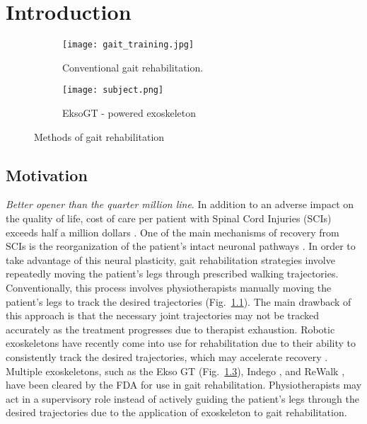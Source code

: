 \chapter{Introduction}

\begin{figure}
	\centering
	\begin{subfigure}{0.45\textwidth}
		\centering
		\texttt{[image: gait\_training.jpg]} %
		\caption{Conventional gait rehabilitation. \cite{gaitrehabgantry}}\label{fig:gantry}
	\end{subfigure}\hfill
	\begin{subfigure}{0.45\textwidth}
		\centering
		\texttt{[image: subject.png]}
		\caption{EksoGT - powered exoskeleton}\label{fig:subject}
	\end{subfigure}
	\caption{Methods of gait rehabilitation}
\end{figure}

\section{Motivation}
%

\textit{Better opener than the quarter million line}. In addition to an adverse impact on the quality of life, cost of care per patient with Spinal Cord Injuries (SCIs) exceeds half a million dollars \cite{devivo2011costs}. One of the main mechanisms of recovery from SCIs is the reorganization of the patient's intact neuronal pathways \cite{curt2008recovery}. In order to take advantage of this neural plasticity, gait rehabilitation strategies involve repeatedly moving the patient's legs through prescribed walking trajectories. Conventionally, this process involves physiotherapists manually moving the patient's legs to track the desired trajectories (Fig.~\ref{fig:gantry}). The main drawback of this approach is that the necessary joint trajectories may not be tracked accurately as the treatment progresses due to therapist exhaustion. Robotic exoskeletons have recently come into use for rehabilitation due to their ability to consistently track the desired trajectories, which may accelerate recovery \cite{hidler2011role}. Multiple exoskeletons, such as the Ekso GT \cite{brenner2016exploring} (Fig.~\ref{fig:subject}), Indego \cite{sup2008design}, and ReWalk \cite{rewalk}, have been cleared by the FDA for use in gait rehabilitation. Physiotherapists may act in a supervisory role instead of actively guiding the patient's legs through the desired trajectories due to the application of exoskeleton to gait rehabilitation. 

